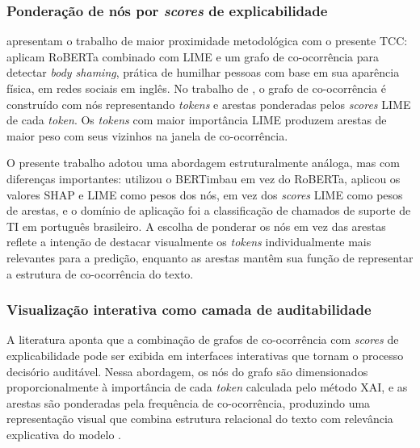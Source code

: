 \documentclass[
    12pt,                %
    openright,           %
    oneside,             %
    a4paper,             %
    english,             %
    brazil               %
]{abntex2}
\begin{document}
\subsubsection{Ponderação de nós por \textit{scores} de explicabilidade}
\label{subsubsec:grafo_xai_ponderacao}

 apresentam o trabalho de maior proximidade 
metodológica com o presente TCC: aplicam RoBERTa combinado com LIME 
e um grafo de co-ocorrência para detectar \textit{body shaming}, 
prática de humilhar pessoas com base em sua aparência física, em 
redes sociais em inglês. No trabalho de , o grafo 
de co-ocorrência é construído com nós representando \textit{tokens} 
e arestas ponderadas pelos \textit{scores} LIME de cada \textit{token}. 
Os \textit{tokens} com maior importância LIME produzem arestas de 
maior peso com seus vizinhos na janela de co-ocorrência.

O presente trabalho adotou uma abordagem estruturalmente análoga, mas com diferenças importantes: utilizou o BERTimbau em vez do RoBERTa, aplicou os valores SHAP e LIME como pesos dos nós, em vez dos \textit{scores} LIME como pesos de arestas, e o domínio de aplicação foi a classificação de chamados de suporte de TI em português brasileiro. A escolha de ponderar os nós em vez das arestas reflete a intenção de destacar visualmente os \textit{tokens} individualmente mais relevantes para a predição, enquanto as arestas mantêm sua função de representar a estrutura de co-ocorrência do texto.

\subsubsection{Visualização interativa como camada de auditabilidade}
\label{subsubsec:grafo_xai_visualizacao}

A literatura aponta que a combinação de grafos de co-ocorrência com \textit{scores} de explicabilidade pode ser exibida em interfaces interativas 
que tornam o processo decisório auditável. Nessa abordagem, os nós 
do grafo são dimensionados proporcionalmente à importância de cada 
\textit{token} calculada pelo método XAI, e as arestas são ponderadas 
pela frequência de co-ocorrência, produzindo uma representação visual 
que combina estrutura relacional do texto com relevância explicativa 
do modelo \cite{talebi2025}.
\end{document}
